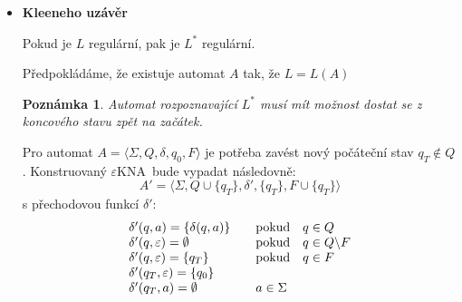 \documentclass[10pt, a4paper, titlepage]{article}
\theoremstyle{note}
\newtheorem{poznamka}{\textbf{Poznámka}}
\newcommand{\ekna}{$\varepsilon$KNA} %
\begin{document}
\begin{itemize}
\begin{center}
\begin{VCPicture}{(-5,-2)(5,2)}
\end{VCPicture}
\end{center}

Sestavíme \ekna
$$A= \langle \Sigma,Q_1  \cup Q_2,\delta,\lbrace q_{01} \rbrace,F_2 \rangle$$
s přechodovou funkcí $\delta : (Q_1 \cup Q_2) \times (\Sigma \cup \lbrace \varepsilon \rbrace ) \rightarrow 2^{Q_1 \times Q_2}$
$$
\delta(q,a)=\left\{
\begin{array}{l@{\quad\mbox{}\quad}l}
\lbrace \delta_1(q,a) \rbrace & \text{pokud}\quad q \in Q_1\\
\lbrace \delta_2(q,a) \rbrace & \text{pokud}\quad q \in Q_2\\
\end{array}
\right.
$$
$$
\delta(q,\varepsilon)=\left\{
\begin{array}{l@{\quad\mbox{}\quad}l}
\lbrace q_{02} \rbrace & \text{pokud}\quad q \in F_1\\
\emptyset & \text{pokud}\quad q \notin F_1\\
\end{array}
\right.
$$

\item
\textbf{Kleeneho uzávěr}

Pokud je $L$ regulární, pak je $L^*$ regulární.

Předpokládáme, že existuje automat $A$ tak, že $L = L(A)$
\begin{poznamka}
Automat rozpoznavající $L^*$ musí mít možnost dostat se z koncového stavu zpět na začátek.
\end{poznamka}
Pro automat $A = \langle \Sigma, Q, \delta, q_0, F \rangle$ je potřeba zavést nový počáteční stav $q_T \notin Q$. Konstruovaný \ekna\ bude vypadat následovně:
$$A' = \langle \Sigma, Q \cup \lbrace q_T \rbrace, \delta ', \lbrace q_T \rbrace, F \cup \lbrace q_T \rbrace \rangle$$
s přechodovou funkcí $\delta '$:
$$
\begin{array}{l@{\quad\mbox{}\quad}l}
\delta ' (q,a) = \lbrace \delta (q,a) \rbrace & \text{pokud}\quad q \in Q\\
\delta ' (q,\varepsilon) = \emptyset & \text{pokud}\quad q \in Q \backslash F\\
\delta ' (q,\varepsilon) = \lbrace q_T \rbrace & \text{pokud}\quad q \in F\\
\delta ' (q_T,\varepsilon) = \lbrace q_0 \rbrace & \\
\delta ' (q_T,a) = \emptyset & a \in \Sigma \\

\end{array}
$$
\end{itemize}
\end{document}
